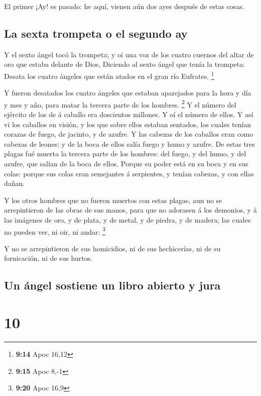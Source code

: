  El primer ¡Ay! es pasado: he aquí, vienen aún dos ayes
después de estas cosas.

\hypertarget{la-sexta-trompeta-o-el-segundo-ay}{%
\subsection{La sexta trompeta o el segundo
ay}\label{la-sexta-trompeta-o-el-segundo-ay}}

 Y el sexto ángel tocó la trompeta; y oí una voz de los
cuatro cuernos del altar de oro que estaba delante de Dios,
 Diciendo al sexto ángel que tenía la trompeta: Desata los
cuatro ángeles que están atados en el gran río Eufrates. \footnote{\textbf{9:14}
  Apoc 16,12}

 Y fueron desatados los cuatro ángeles que estaban
aparejados para la hora y día y mes y año, para matar la tercera parte
de los hombres. \footnote{\textbf{9:15} Apoc 8,-1}  Y el
número del ejército de los de á caballo era doscientos millones. Y oí el
número de ellos.  Y así vi los caballos en visión, y los
que sobre ellos estaban sentados, los cuales tenían corazas de fuego, de
jacinto, y de azufre. Y las cabezas de los caballos eran como cabezas de
leones; y de la boca de ellos salía fuego y humo y azufre. 
De estas tres plagas fué muerta la tercera parte de los hombres: del
fuego, y del humo, y del azufre, que salían de la boca de ellos.
 Porque su poder está en su boca y en sus colas: porque sus
colas eran semejantes á serpientes, y tenían cabezas, y con ellas dañan.

 Y los otros hombres que no fueron muertos con estas
plagas, aun no se arrepintieron de las obras de sus manos, para que no
adorasen á los demonios, y á las imágenes de oro, y de plata, y de
metal, y de piedra, y de madera; las cuales no pueden ver, ni oir, ni
andar: \footnote{\textbf{9:20} Apoc 16,9}

 Y no se arrepintieron de sus homicidios, ni de sus
hechicerías, ni de su fornicación, ni de sus hurtos.

\hypertarget{un-uxe1ngel-sostiene-un-libro-abierto-y-jura}{%
\subsection{Un ángel sostiene un libro abierto y
jura}\label{un-uxe1ngel-sostiene-un-libro-abierto-y-jura}}

\hypertarget{section-9}{%
\section{10}\label{section-9}}

